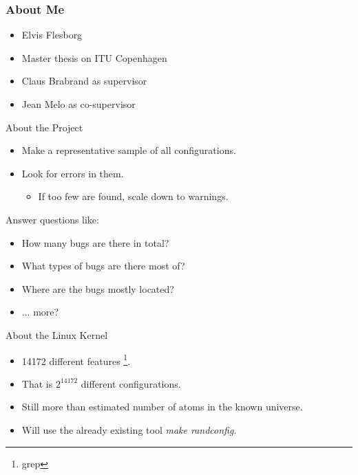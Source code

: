 \documentclass[mathserif,serif]{beamer}
\newenvironment{items}{
\begin{itemize}
  \setlength{\itemsep}{0pt}
  \setlength{\parskip}{7pt}
  \setlength{\parsep}{4pt}
}{\end{itemize}}
\begin{document}
\begin{frame}[t]
    \frametitle{About Me}

    \begin{items}
        \item Elvis Flesborg

        \item Master thesis on ITU Copenhagen
        \item Claus Brabrand as supervisor
        \item Jean Melo as co-supervisor
    \end{items}
\end{frame}

\begin{frame}[t]{About the Project}
    

    \begin{items}
        \item Make a representative sample of all configurations.
        \item Look for errors in them.
        \begin{items}
            \item If too few are found, scale down to warnings.
        \end{items}
    \end{items}

    
    Answer questions like:
    

    \begin{items}
        \item How many bugs are there in total?
        \item What types of bugs are there most of?
        \item Where are the bugs mostly located?
        \item ... more?
    \end{items}
\end{frame}

\begin{frame}[t]{About the Linux Kernel}
    

    \begin{items}
        \item 14172 different features \footnote{ grep }.
        \item That is $2^{14172}$ different configurations.
        \item Still more than estimated number of atoms in the known universe.
        \item Will use the already existing tool \emph{make randconfig}.
    \end{items}
\end{frame}
\end{document}

